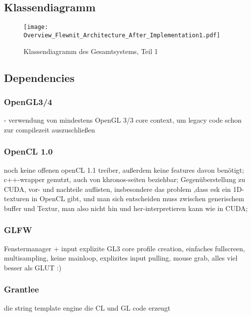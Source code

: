 
\label{sec:systemArchitecture}

	
 

\subsection{Klassendiagramm}

\begin{figure}[!h]
	 \texttt{[image: Overview\_Flewnit\_Architecture\_After\_Implementation1.pdf]}
	\caption{Klassendiagramm des Gesamtsystems, Teil 1}
	\label{fig:ClassDiagOverview1}
\end{figure}



\subsection{Dependencies}
	\label{sec:dependencies}

		
	\subsubsection{OpenGL3/4}
	
	- verwendung von mindestens OpenGL 3/3 core context, um legacy code schon zur compilezeit auszuschließen
	
	
    \subsubsection{OpenCL 1.0}
    	noch keine offenen openCL 1.1 treiber, außerdem keine features davon benötigt;
    	c++-wrapper genutzt, auch von khronos-seiten beziehbar;
    	Gegenüberstellung zu CUDA, vor- und nachteile auflisten, insbesondere das problem ,dass esk ein 1D-texturen in OpenCL gibt, und man sich entscheiden muss zwischen generischem buffer und Textur, man also nicht hin und her-interpretieren kann wie in CUDA;
    
    
    \subsubsection{GLFW}
    	Fenstermanager + input
    	explizite GL3 core profile creation, einfaches fullscreen, multisampling, keine mainloop, explizites input pulling, 
    	mouse grab, alles viel besser als GLUT :)
    \subsubsection{Grantlee}
       die string template engine die CL und GL code erzeugt
